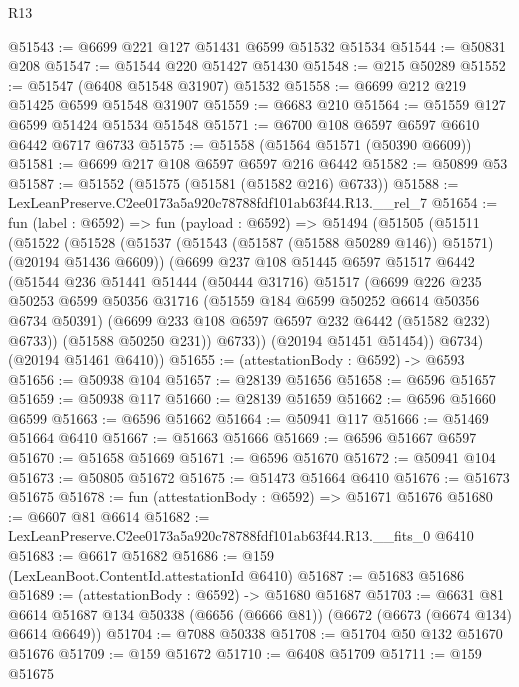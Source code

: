 \begin{lexlean}{R13}
\begin{coremodule}
@51543 := @6699 @221 @127 @51431 @6599 @51532 @51534
@51544 := @50831 @208
@51547 := @51544 @220 @51427 @51430
@51548 := @215 @50289
@51552 := @51547 (@6408 @51548 @31907) @51532
@51558 := @6699 @212 @219 @51425 @6599 @51548 @31907
@51559 := @6683 @210
@51564 := @51559 @127 @6599 @51424 @51534 @51548
@51571 := @6700 @108 @6597 @6597 @6610 @6442 @6717 @6733
@51575 := @51558 (@51564 @51571 (@50390 @6609))
@51581 := @6699 @217 @108 @6597 @6597 @216 @6442
@51582 := @50899 @53
@51587 := @51552 (@51575 (@51581 (@51582 @216) @6733))
@51588 := LexLeanPreserve.C2ee0173a5a920c78788fdf101ab63f44.R13.__rel_7
@51654 := fun (label : @6592) =>
  fun (payload : @6592) =>
  @51494
    (@51505
      (@51511
        (@51522
          (@51528
            (@51537 (@51543 (@51587 (@51588 @50289 @146)) @51571) (@20194 @51436 @6609))
            (@6699
              @237
              @108
              @51445
              @6597
              @51517
              @6442
              (@51544
                @236
                @51441
                @51444
                (@50444 @31716)
                @51517
                (@6699
                  @226
                  @235
                  @50253
                  @6599
                  @50356
                  @31716
                  (@51559 @184 @6599 @50252 @6614 @50356 @6734 @50391)
                  (@6699 @233 @108 @6597 @6597 @232 @6442 (@51582 @232) @6733))
                (@51588 @50250 @231))
              @6733))
          (@20194 @51451 @51454))
        @6734)
      (@20194 @51461 @6410))
@51655 := (attestationBody : @6592) -> @6593
@51656 := @50938 @104
@51657 := @28139 @51656
@51658 := @6596 @51657
@51659 := @50938 @117
@51660 := @28139 @51659
@51662 := @6596 @51660 @6599
@51663 := @6596 @51662
@51664 := @50941 @117
@51666 := @51469 @51664 @6410
@51667 := @51663 @51666
@51669 := @6596 @51667 @6597
@51670 := @51658 @51669
@51671 := @6596 @51670
@51672 := @50941 @104
@51673 := @50805 @51672
@51675 := @51473 @51664 @6410
@51676 := @51673 @51675
@51678 := fun (attestationBody : @6592) => @51671 @51676
@51680 := @6607 @81 @6614
@51682 := LexLeanPreserve.C2ee0173a5a920c78788fdf101ab63f44.R13.__fits_0 @6410
@51683 := @6617 @51682
@51686 := @159 (LexLeanBoot.ContentId.attestationId @6410)
@51687 := @51683 @51686
@51689 := (attestationBody : @6592) -> @51680 @51687
@51703 := @6631
    @81
    @6614
    @51687
    @134
    @50338
    (@6656 (@6666 @81))
    (@6672 (@6673 (@6674 @134) @6614 @6649))
@51704 := @7088 @50338
@51708 := @51704 @50 @132 @51670 @51676
@51709 := @159 @51672
@51710 := @6408 @51709
@51711 := @159 @51675

\end{coremodule}
\end{lexlean}

